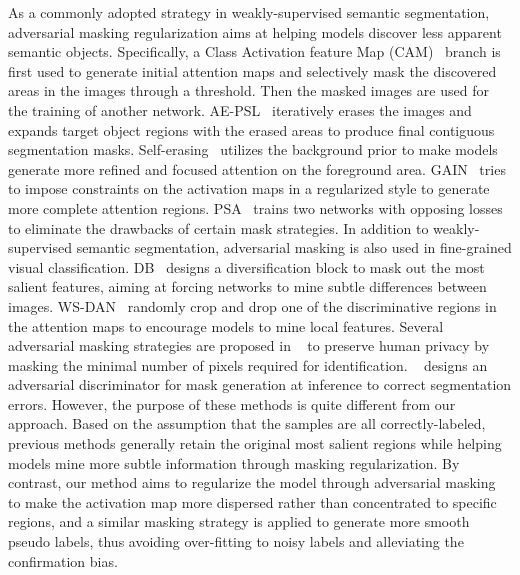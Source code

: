 \documentclass[10pt,twocolumn,letterpaper]{article}
\begin{document}
As a commonly {adopted} strategy in weakly-supervised semantic segmentation, adversarial masking regularization aims at helping models discover {less apparent} semantic objects. Specifically, a {Class Activation feature Map (CAM)~\cite{gradCAM}} branch is first used to generate initial attention maps and selectively mask the discovered areas in the images through a threshold. Then the masked images are used for the training of another network. AE-PSL~\cite{wei2017object} iteratively erases the images and expands target object regions with the erased areas to produce final contiguous segmentation masks. Self-erasing~\cite{hou2018self} utilizes the background prior to make models generate more refined and focused attention on the foreground area. GAIN~\cite{li2018tell} tries to impose constraints on the activation maps in a regularized style to generate more complete attention regions. PSA~\cite{stammes2021find} trains two networks with opposing losses to eliminate the drawbacks of certain mask strategies. In addition to weakly-supervised semantic segmentation, adversarial masking is also used in fine-grained visual classification. DB~\cite{sun2020fine} designs a diversification block to mask out the most salient features, aiming at forcing networks to mine subtle differences between images. WS-DAN~\cite{hu2019see} randomly crop and drop one of the discriminative regions in the attention maps to encourage models to mine local features. \textcolor[rgb]{0,0,0}{Several adversarial masking strategies are proposed in ~\cite{gupta2021adversarial,yang2021towards} to preserve human privacy by masking the minimal number of pixels required for identification. ~\cite{valvano2021re} designs an adversarial discriminator for mask generation at inference to correct segmentation errors.} However, the purpose of these methods is quite different from our approach. Based on the {assumption} that the samples are all correctly-labeled, previous methods generally retain the original most salient regions while helping models mine more subtle information through masking regularization. By contrast, our method aims to regularize the model through adversarial masking to make the activation map more dispersed rather than concentrated to specific regions, {and a similar masking strategy is applied to generate more smooth pseudo labels}, thus avoiding over-fitting to noisy labels and alleviating the confirmation bias. 


\label{headings}
\end{document}
